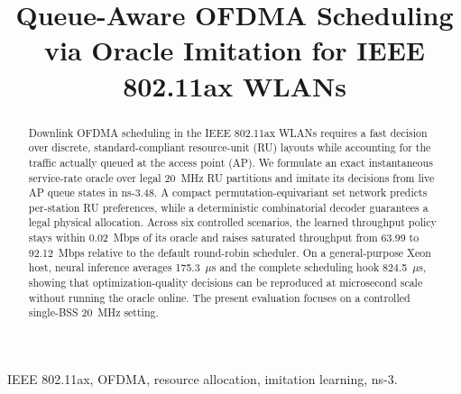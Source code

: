 \documentclass[lettersize,journal]{IEEEtran}
\begin{document}

\newcommand{\cP}{\mathcal{P}}
\newcommand{\cR}{\mathcal{R}}
\newcommand{\cA}{\mathcal{A}}
\newcommand{\ind}{\mathbf{1}}

\title{Queue-Aware OFDMA Scheduling via Oracle Imitation for IEEE 802.11ax WLANs}
\author{
}

\maketitle
\begin{abstract}
Downlink OFDMA scheduling in the IEEE 802.11ax WLANs requires a fast decision over discrete,
standard-compliant resource-unit (RU) layouts while accounting for the traffic
actually queued at the access point (AP). We formulate an exact instantaneous
service-rate oracle over legal 20~MHz RU partitions and imitate its decisions
from live AP queue states in ns-3.48. A compact permutation-equivariant set
network predicts per-station RU preferences, while a deterministic
combinatorial decoder guarantees a legal physical allocation. Across six
controlled scenarios, the learned throughput policy stays within 0.02~Mbps of
its oracle and raises saturated throughput from 63.99 to 92.12~Mbps relative
to the default round-robin scheduler. On a general-purpose Xeon host, neural
inference averages 175.3~$\mu$s and the complete scheduling hook 824.5~$\mu$s,
showing that optimization-quality decisions can be reproduced at microsecond
scale without running the oracle online. The present evaluation focuses on a
controlled single-BSS 20~MHz setting.
\end{abstract}
\begin{IEEEkeywords}
IEEE 802.11ax, OFDMA, resource allocation, imitation learning, ns-3.
\end{IEEEkeywords}
\end{document}
